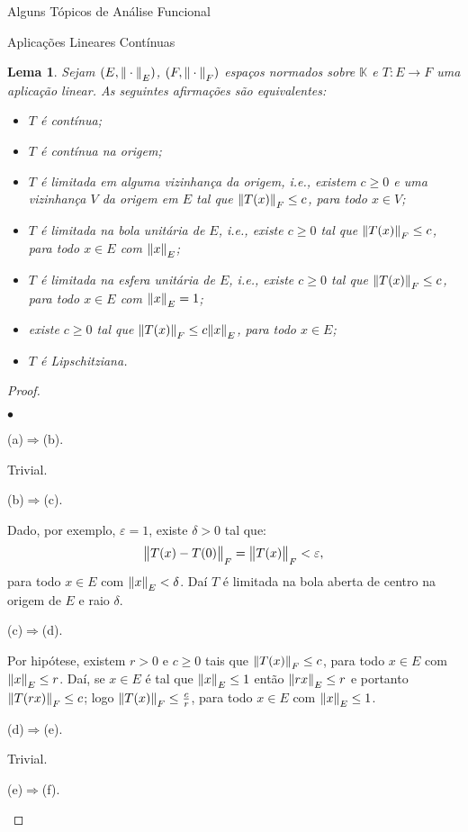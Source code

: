 \documentclass[oneside,final,11pt]{amsbook}
\newcommand{\K}{\mathds K}
\newcommand{\norma}[2]{\Vert#1\Vert_{\lower2pt\hbox{$\scriptstyle#2$}}}
\newcommand{\bignorma}[2]{\big\Vert#1\big\Vert_{\lower2pt\hbox{$\scriptstyle#2$}}}
\newcounter{contador}
\newenvironment{bulletindent}{\setcounter{contador}{0}
\begin{list} {$\bullet$}
{\usecounter{contador}
\setlength{\leftmargin}{10pt}
\setlength{\rightmargin}{10pt}
\setlength{\labelsep}{5pt}
\setlength{\itemsep}{10pt}
\setlength{\topsep}{10pt}}}
{\end{list}}
\theoremstyle{remark}\newtheorem{exercise}{Exercício}[chapter]
\theoremstyle{remark}\newtheorem{*exercise}[exercise]{\hbox to 0pt{\hskip 0pt minus 1fil*}Exercício}
\theoremstyle{definition}\newtheorem{exdefin}{Definição}[chapter]
\theoremstyle{plain}\newtheorem{teo}{Teorema}[section]
\theoremstyle{plain}\newtheorem{lem}[teo]{Lema}
\theoremstyle{plain}\newtheorem{prop}[teo]{Proposição}
\theoremstyle{plain}\newtheorem{cor}[teo]{Corolário}
\theoremstyle{definition}\newtheorem{defin}[teo]{Definição}
\theoremstyle{remark}\newtheorem{rem}[teo]{Observação}
\theoremstyle{definition}\newtheorem{notation}[teo]{Notação}
\theoremstyle{definition}\newtheorem{convention}[teo]{Convenção}
\theoremstyle{definition}\newtheorem{example}[teo]{Exemplo}
\numberwithin{section}{chapter}
\numberwithin{equation}{section}
\begin{document}
\begin{chapter}{Alguns Tópicos de Análise Funcional}
\begin{section}{Aplicações Lineares Contínuas}
\begin{lem}\label{thm:equivlincont}
Sejam $(E,\norma\cdot E)$, $(F,\norma\cdot F)$ espaços normados sobre $\K$
e $T:E\to F$ uma aplicação linear. As seguintes afirmações são equivalentes:
\begin{itemize}
\item[(a)] $T$ é contínua;
\item[(b)] $T$ é contínua na origem;
\item[(c)] $T$ é limitada em alguma vizinhança da origem, i.e., existem $c\ge0$ e uma vizinhança $V$ da origem
em $E$ tal que $\norma{T(x)}F\le c$, para todo $x\in V$;
\item[(d)] $T$ é limitada na bola unitária de $E$, i.e., existe $c\ge0$ tal que $\norma{T(x)}F\le c$,
para todo $x\in E$ com $\norma xE$;
\item[(e)] $T$ é limitada na esfera unitária de $E$, i.e., existe $c\ge0$ tal que $\norma{T(x)}F\le c$,
para todo $x\in E$ com $\norma xE=1$;
\item[(f)] existe $c\ge0$ tal que $\norma{T(x)}F\le c\norma xE$, para todo $x\in E$;
\item[(g)] $T$ é Lipschitziana.
\end{itemize}
\end{lem}
\begin{proof}\
\begin{bulletindent}
\item (a)$\Rightarrow$(b).

Trivial.

\item (b)$\Rightarrow$(c).

Dado, por exemplo, $\varepsilon=1$, existe $\delta>0$ tal que:
\[\bignorma{T(x)-T(0)}F=\bignorma{T(x)}F<\varepsilon,\]
para todo $x\in E$ com $\norma xE<\delta$. Daí $T$ é limitada na bola aberta de centro na origem de $E$ e raio $\delta$.

\item (c)$\Rightarrow$(d).

Por hipótese, existem $r>0$ e $c\ge0$ tais que $\norma{T(x)}F\le c$, para todo $x\in E$ com $\norma xE\le r$.
Daí, se $x\in E$ é tal que $\norma xE\le1$ então $\norma{rx}E\le r$ e portanto $\norma{T(rx)}F\le c$;
logo $\norma{T(x)}F\le\frac cr$, para todo $x\in E$ com $\norma xE\le1$.

\item (d)$\Rightarrow$(e).

Trivial.

\item (e)$\Rightarrow$(f).


\end{bulletindent}
\end{proof}
\end{section}
\end{chapter}
\end{document}
